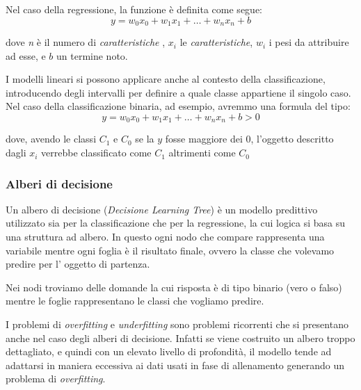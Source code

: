 \documentclass[a4paper,12pt]{report}
\begin{document}
Nel caso della regressione, la funzione è definita come segue: 
\begin{equation*}
    y  = w_0x_0 + w_1x_1 + \dots + w_nx_n + b
\end{equation*}

dove \textit{n} è il numero di \textit{caratteristiche} , $x_i$ le \textit{caratteristiche}, $w_i$ i pesi da attribuire ad esse, e $b$ un termine noto.

\bigskip

I modelli lineari si possono applicare anche al contesto della classificazione, introducendo degli intervalli per definire a quale classe appartiene il singolo caso. Nel caso della classificazione binaria, ad esempio, avremmo una formula del tipo:
\begin{equation*}
    y = w_0x_0 + w_1x_1 + \dots + w_nx_n + b > 0
\end{equation*}

dove, avendo le classi $C_1$ e $C_0$ se la $y$ fosse maggiore dei 0, l'oggetto descritto dagli $x_i$ verrebbe classificato come $C_1$ altrimenti come $C_0$


\subsubsection{Alberi di decisione}


Un albero di decisione (\textit{Decisione Learning Tree}) è un modello predittivo   utilizzato sia per la classificazione che per la regressione, la cui logica si basa su una struttura ad albero. In questo ogni nodo che compare rappresenta una variabile mentre ogni foglia è il risultato finale, ovvero la classe che volevamo predire per l' oggetto di partenza.



Nei nodi troviamo delle domande la cui risposta è di tipo binario (vero o falso) mentre le foglie rappresentano le classi che vogliamo predire.

I problemi di \textit{overfitting} e \textit{underfitting} sono problemi ricorrenti che si presentano anche nel caso degli alberi di decisione. Infatti se viene costruito un albero troppo dettagliato, e quindi con un elevato livello di profondità, il modello tende ad adattarsi in maniera eccessiva ai dati usati in fase di allenamento generando un problema di \textit{overfitting}.
\end{document}
